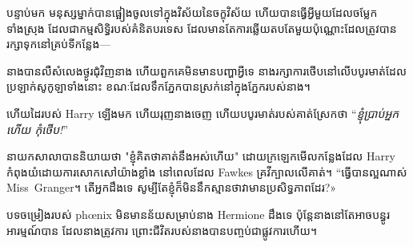 បន្ទាប់មក មនុស្សម្នាក់បានផ្អៀងចូលទៅក្នុងវិស័យនៃចក្ខុវិស័យ ហើយបានធ្វើអ្វីមួយដែលចម្លែកទាំងស្រុង ដែលជាកម្មសិទ្ធិរបស់គំនិតបរទេស ដែលមានតែការឆ្លើយតបតែមួយប៉ុណ្ណោះដែលត្រូវបានរក្សាទុកនៅគ្រប់ទីកន្លែង—

\later

នាងបានលឺសំលេងថ្ងូរជុំវិញនាង ហើយពួកគេមិនមានបញ្ហាអ្វីទេ នាងរក្សាការថើបនៅលើបបូរមាត់ដែលប្រឡាក់សូកូឡាទាំងនោះ ខណៈដែលទឹកភ្នែកបានស្រក់នៅក្នុងភ្នែករបស់នាង។

ហើយដៃរបស់ Harry ឡើងមក ហើយរុញនាងចេញ ហើយបបូរមាត់របស់គាត់ស្រែកថា “\emph{ខ្ញុំប្រាប់អ្នកហើយ កុំថើប!}”

\later

នាយកសាលាបាននិយាយថា "ខ្ញុំគិតថាគាត់នឹងអស់ហើយ" ដោយក្រឡេកមើលកន្លែងដែល Harry កំពុងយំដោយការសោកសៅយ៉ាងខ្លាំង នៅពេលដែល Fawkes គ្រវីក្បាលលើគាត់។ “ធ្វើបានល្អណាស់ Miss~Granger។ តើអ្នកដឹងទេ សូម្បីតែខ្ញុំក៏មិននឹកស្មានថាវាមានប្រសិទ្ធភាពដែរ?»

បទចម្រៀងរបស់ phœnix មិនមានន័យសម្រាប់នាង Hermione ដឹងទេ ប៉ុន្តែនាងនៅតែអាចបន្ធូរអារម្មណ៍បាន ដែលនាងត្រូវការ ព្រោះជីវិតរបស់នាងបានបញ្ចប់ជាផ្លូវការហើយ។

